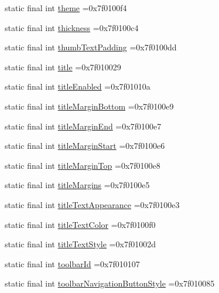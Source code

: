 \begin{DoxyCompactItemize}
\item 
static final int \hyperlink{classproject4_1_1xaria_1_1R_1_1attr_a3a1cfb55c7674dd47bf8a98e450fd555}{theme} =0x7f0100f4
\item 
static final int \hyperlink{classproject4_1_1xaria_1_1R_1_1attr_ae1315bb2ab86268cdec026c156603d77}{thickness} =0x7f0100c4
\item 
static final int \hyperlink{classproject4_1_1xaria_1_1R_1_1attr_ad480b6c72ae6418dbe211ccf324e6db9}{thumb\+Text\+Padding} =0x7f0100dd
\item 
static final int \hyperlink{classproject4_1_1xaria_1_1R_1_1attr_ae417c426a307613087f798ef5151d656}{title} =0x7f010029
\item 
static final int \hyperlink{classproject4_1_1xaria_1_1R_1_1attr_a9ac0767b9114d9fdd93f429cd5c1c5ba}{title\+Enabled} =0x7f01010a
\item 
static final int \hyperlink{classproject4_1_1xaria_1_1R_1_1attr_af1a704f2a2dce75feee66d6e973fe45c}{title\+Margin\+Bottom} =0x7f0100e9
\item 
static final int \hyperlink{classproject4_1_1xaria_1_1R_1_1attr_a062d6f4d6131631de7f24681a4d3e76b}{title\+Margin\+End} =0x7f0100e7
\item 
static final int \hyperlink{classproject4_1_1xaria_1_1R_1_1attr_aba51383cd6c25710b454bb8286cd4000}{title\+Margin\+Start} =0x7f0100e6
\item 
static final int \hyperlink{classproject4_1_1xaria_1_1R_1_1attr_aa83afdd7261db5ec23d63e2f1926065f}{title\+Margin\+Top} =0x7f0100e8
\item 
static final int \hyperlink{classproject4_1_1xaria_1_1R_1_1attr_ae9ef3130a8d3b2c8c623df648df77149}{title\+Margins} =0x7f0100e5
\item 
static final int \hyperlink{classproject4_1_1xaria_1_1R_1_1attr_a90b3b1240e8abc49d8ee162f3f988853}{title\+Text\+Appearance} =0x7f0100e3
\item 
static final int \hyperlink{classproject4_1_1xaria_1_1R_1_1attr_a27138be6d8688a31b14accd2825e1b55}{title\+Text\+Color} =0x7f0100f0
\item 
static final int \hyperlink{classproject4_1_1xaria_1_1R_1_1attr_a053417a8f9179bec664e1a5fe77b9759}{title\+Text\+Style} =0x7f01002d
\item 
static final int \hyperlink{classproject4_1_1xaria_1_1R_1_1attr_a8b8afb34277b3685f25daffebf6ab3ee}{toolbar\+Id} =0x7f010107
\item 
static final int \hyperlink{classproject4_1_1xaria_1_1R_1_1attr_a0dd7d3badd3c68b19ec4f38f6b65fc38}{toolbar\+Navigation\+Button\+Style} =0x7f010085

\end{DoxyCompactItemize}
